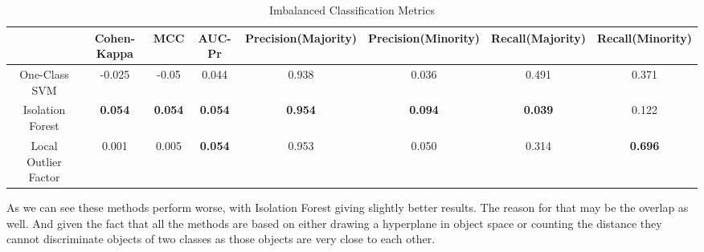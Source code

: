 \begin{table}[htpb]

	\centering
	\caption{Imbalanced Classification Metrics}
	\label{tab:metircs_imb}
	\resizebox{15cm}{!}
	{
\begin{tabular}{|c|c|c|c|c|c|c|c|}
	\hline
	 & \textbf{Cohen-Kappa} &	\textbf{MCC} & \textbf{AUC-Pr} & \textbf{Precision(Majority)} & \textbf{Precision(Minority)} & \textbf{Recall(Majority)} &	
 \textbf{Recall(Minority)} \\
	 \hline
		One-Class SVM & -0.025	& -0.05	& 0.044	& 0.938 &	0.036	& 0.491	& 0.371 \\
		\hline
		Isolation Forest & \textbf{0.054} & \textbf{0.054} &	\textbf{0.054}	& \textbf{0.954} &	\textbf{0.094}	& \textbf{0.039}	& 0.122 \\
		\hline
		Local Outlier Factor & 0.001 & 0.005 & \textbf{0.054} & 0.953 & 0.050	& 0.314	& \textbf{0.696} \\
		\hline
	\end{tabular}
}
\end{table}
\noindent
As we can see these methods perform worse, with Isolation Forest giving slightly better results.
The reason for that may be the overlap as well.
And given the fact that all the methods are based on either drawing a hyperplane in object space or counting the distance
they cannot discriminate objects of two classes as those objects are very close to each other.
